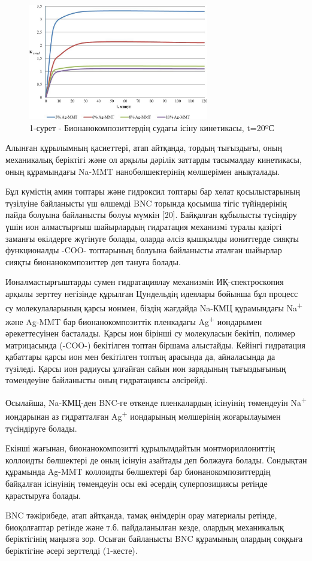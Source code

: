 \begin{figure}[H]
	\centering
	\includegraphics[width=0.7\textwidth]{media/chem/image14}
	\caption*{1-сурет - Бионанокомпозиттердің судағы ісіну кинетикасы, t=20ºС}
\end{figure}

\begin{multicols}{2}
Алынған құрылымның қасиеттері, атап айтқанда, тордың тығыздығы, оның
механикалық беріктігі және ол арқылы дәрілік заттарды тасымалдау
кинетикасы, оның құрамындағы Na-MMT нанобөлшектерінің мөлшерімен
анықталады.

Бұл күмістің амин топтары және гидроксил топтары бар хелат
қосылыстарының түзілуіне байланысты үш өлшемді BNC торында қосымша тігіс
түйіндерінің пайда болуына байланысты болуы мүмкін {[}20{]}. Байқалған
құбылысты түсіндіру үшін ион алмастырғыш шайырлардың гидратация
механизмі туралы қазіргі заманғы өкілдерге жүгінуге болады, оларда әлсіз
қышқылды иониттерде сияқты функционалды -COO- топтарының болуына
байланысты аталған шайырлар сияқты бионанокомпозиттер деп тануға болады.

Ионалмастырғыштарды сумен гидратациялау механизмін ИҚ-спектроскопия
арқылы зерттеу негізінде құрылған Цундельдің идеялары бойынша бұл
процесс су молекулаларының қарсы ионмен, біздің жағдайда Na-КМЦ
құрамындағы Na\textsuperscript{+} және Ag-MMT бар бионанокомпозиттік
пленкадағы Ag\textsuperscript{+} иондарымен әрекеттесуінен басталады.
Қарсы ион бірінші су молекуласын бекітіп, полимер матрицасында (-COO-)
бекітілген топтан біршама алыстайды. Кейінгі гидратация қабаттары қарсы
ион мен бекітілген топтың арасында да, айналасында да түзіледі. Қарсы
ион радиусы ұлғайған сайын ион зарядының тығыздығының төмендеуіне
байланысты оның гидратациясы әлсірейді.

Осылайша, Na-КМЦ-ден BNC-ге өткенде пленкалардың ісінуінің төмендеуін
Na\textsuperscript{+} иондарынан аз гидратталған Ag\textsuperscript{+}
иондарының мөлшерінің жоғарылауымен түсіндіруге болады.

Екінші жағынан, бионанокомпозитті құрылымдайтын монтмориллониттің
коллоидты бөлшектері де оның ісінуін азайтады деп болжауға болады.
Сондықтан құрамында Ag-MMT коллоидты бөлшектері бар
бионанокомпозиттердің байқалған ісінуінің төмендеуін осы екі әсердің
суперпозициясы ретінде қарастыруға болады.

BNC тәжірибеде, атап айтқанда, тамақ өнімдерін орау материалы ретінде,
биоқолғаптар ретінде және т.б. пайдаланылған кезде, олардың механикалық
беріктігінің маңызға зор. Осыған байланысты BNC құрамының олардың
соққыға беріктігіне әсері зерттелді (1-кесте).
\end{multicols}

